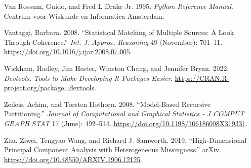 \begin{CSLReferences}{1}{0}
\leavevmode{}%
Van Rossum, Guido, and Fred L Drake Jr. 1995. \emph{Python Reference Manual}. Centrum voor Wiskunde en Informatica Amsterdam.

\leavevmode{}%
Vantaggi, Barbara. 2008. {``Statistical Matching of Multiple Sources: A Look Through Coherence.''} \emph{Int. J. Approx. Reasoning} 49 (November): 701--11. \url{https://doi.org/10.1016/j.ijar.2008.07.005}.

\leavevmode{}%
Wickham, Hadley, Jim Hester, Winston Chang, and Jennifer Bryan. 2022. \emph{Devtools: Tools to Make Developing {R} Packages Easier}. \url{https://CRAN.R-project.org/package=devtools}.

\leavevmode{}%
Zeileis, Achim, and Torsten Hothorn. 2008. {``Model-Based Recursive Partitioning.''} \emph{Journal of Computational and Graphical Statistics - J COMPUT GRAPH STAT} 17 (June): 492--514. \url{https://doi.org/10.1198/106186008X319331}.

\leavevmode{}%
Zhu, Ziwei, Tengyao Wang, and Richard J. Samworth. 2019. {``High-Dimensional Principal Component Analysis with Heterogeneous Missingness.''} arXiv. \url{https://doi.org/10.48550/ARXIV.1906.12125}.

\end{CSLReferences}



\address{%
Gregory Guernec\\
Université de Toulouse, INSERM, UPS\\%
INSERM, CERPOP, UMR 1295\\ Toulouse, France\\
%
%
\textit{ORCiD: \href{https://orcid.org/0000-0002-0668-8606}{0000-0002-0668-8606}}\\%
\href{mailto:gregory.guernec@inserm.fr}{\nolinkurl{gregory.guernec@inserm.fr}}%
}

\address{%
Valerie Gares\\
INSA, Université de Rennes\\%
CNRS, IRMAR, UMR 6625\\ Rennes, France\\
%
\url{http://vgares.perso.math.cnrs.fr/contact.html}\\%
%
\href{mailto:valerie.gares@insa-rennes.fr}{\nolinkurl{valerie.gares@insa-rennes.fr}}%
}

